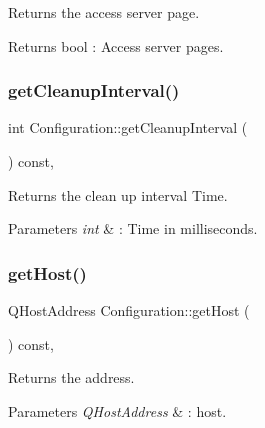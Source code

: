 Returns the access server page. 

\begin{DoxyReturn}{Returns}
bool \+: Access server pages. 
\end{DoxyReturn}
\mbox{\label{class_configuration_a7a761377328a3212a8387d033282b78e}} 
\subsubsection{\texorpdfstring{get\+Cleanup\+Interval()}{getCleanupInterval()}}
{\footnotesize\ttfamily int Configuration\+::get\+Cleanup\+Interval (\begin{DoxyParamCaption}{ }\end{DoxyParamCaption}) const\hspace{0.3cm}{\ttfamily [inline]}, {\ttfamily [noexcept]}}



Returns the clean up interval Time. 


\begin{DoxyParams}{Parameters}
{\em int} & \+: Time in milliseconds. \\
\hline
\end{DoxyParams}
\mbox{\label{class_configuration_a47b1c954104ceea3c18fac417c1df323}} 
\subsubsection{\texorpdfstring{get\+Host()}{getHost()}}
{\footnotesize\ttfamily Q\+Host\+Address Configuration\+::get\+Host (\begin{DoxyParamCaption}{ }\end{DoxyParamCaption}) const\hspace{0.3cm}{\ttfamily [inline]}, {\ttfamily [noexcept]}}



Returns the address. 


\begin{DoxyParams}{Parameters}
{\em Q\+Host\+Address} & \+: host. \\
\hline
\end{DoxyParams}
\mbox{\label{class_configuration_ab67d7ba6abdfc27f5a66042377b01cd4}} 
